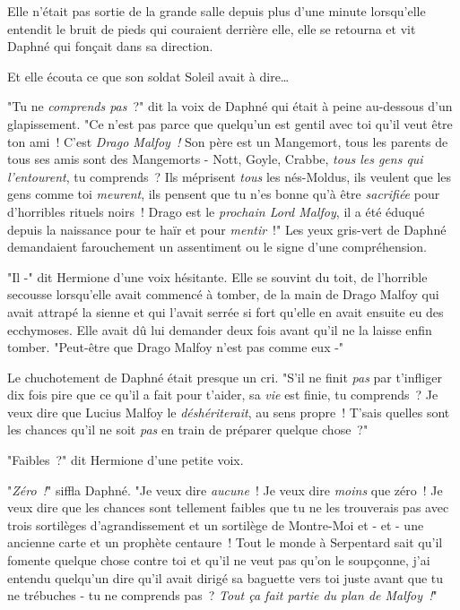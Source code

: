Elle n'était pas sortie de la grande salle depuis plus d'une minute lorsqu'elle entendit le bruit de pieds qui couraient derrière elle, elle se retourna et vit Daphné qui fonçait dans sa direction.

Et elle écouta ce que son soldat Soleil avait à dire…

"Tu ne \emph{comprends pas}~?" dit la voix de Daphné qui était à peine au-dessous d'un glapissement. "Ce n'est pas parce que quelqu'un est gentil avec toi qu'il veut être ton ami~! C'est \emph{Drago Malfoy~!} Son père est un Mangemort, tous les parents de tous ses amis sont des Mangemorts - Nott, Goyle, Crabbe, \emph{tous les gens qui l'entourent}, tu comprends~? Ils méprisent \emph{tous} les nés-Moldus, ils veulent que les gens comme toi \emph{meurent}, ils pensent que tu n'es bonne qu'à être \emph{sacrifiée} pour d'horribles rituels noirs~! Drago est le \emph{prochain Lord Malfoy}, il a été éduqué depuis la naissance pour te haïr et pour \emph{mentir}~!" Les yeux gris-vert de Daphné demandaient farouchement un assentiment ou le signe d'une compréhension.

"Il -" dit Hermione d'une voix hésitante. Elle se souvint du toit, de l'horrible secousse lorsqu'elle avait commencé à tomber, de la main de Drago Malfoy qui avait attrapé la sienne et qui l'avait serrée si fort qu'elle en avait ensuite eu des ecchymoses. Elle avait dû lui demander deux fois avant qu'il ne la laisse enfin tomber. "Peut-être que Drago Malfoy n'est pas comme eux -"

Le chuchotement de Daphné était presque un cri. "S'il ne finit \emph{pas} par t'infliger dix fois pire que ce qu'il a fait pour t'aider, sa \emph{vie} est finie, tu comprends~? Je veux dire que Lucius Malfoy le \emph{déshériterait}, au sens propre~! T'sais quelles sont les chances qu'il ne soit \emph{pas} en train de préparer quelque chose~?"

"Faibles~?" dit Hermione d'une petite voix.

"\emph{Zéro~!}" siffla Daphné. "Je veux dire \emph{aucune}~! Je veux dire \emph{moins} que zéro~! Je veux dire que les chances sont tellement faibles que tu ne les trouverais pas avec trois sortilèges d'agrandissement et un sortilège de Montre-Moi et - et - une ancienne carte et un prophète centaure~! Tout le monde à Serpentard sait qu'il fomente quelque chose contre toi et qu'il ne veut pas qu'on le soupçonne, j'ai entendu quelqu'un dire qu'il avait dirigé sa baguette vers toi juste avant que tu ne trébuches - tu ne comprends pas~? \emph{Tout ça fait partie du plan de Malfoy~!}"

